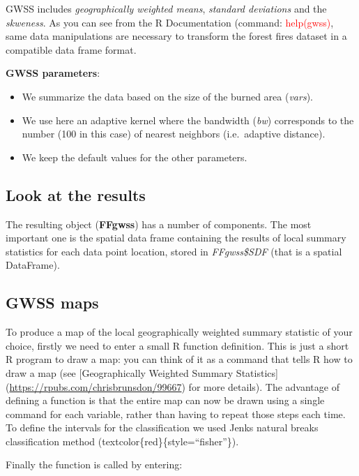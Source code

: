 \documentclass[
]{book}
\theoremstyle{definition}
\theoremstyle{definition}
\theoremstyle{definition}
\theoremstyle{definition}
\theoremstyle{remark}
\begin{document}
GWSS includes \emph{geographically weighted means}, \emph{standard deviations} and the \emph{skweness}.
As you can see from the R Documentation (command: \textcolor{red}{help(gwss)}, same data manipulations are necessary to transform the forest fires dataset in a compatible data frame format.

\textbf{GWSS parameters}:

\begin{itemize}
\item
  We summarize the data based on the size of the burned area (\emph{vars}).
\item
  We use here an adaptive kernel where the bandwidth (\emph{bw}) corresponds to the number (100 in this case) of nearest neighbors (i.e.~adaptive distance).
\item
  We keep the default values for the other parameters.
\end{itemize}

\hypertarget{look-at-the-results}{%
\subsection{Look at the results}\label{look-at-the-results}}

The resulting object (\textbf{FFgwss}) has a number of components.
The most important one is the spatial data frame containing the results of local summary statistics for each data point location, stored in \emph{FFgwss\$SDF} (that is a spatial DataFrame).

\hypertarget{gwss-maps}{%
\subsection{GWSS maps}\label{gwss-maps}}

To produce a map of the local geographically weighted summary statistic of your choice, firstly we need to enter a small R function definition.
This is just a short R program to draw a map: you can think of it as a command that tells R how to draw a map (see {[}Geographically Weighted Summary Statistics{]} (\url{https://rpubs.com/chrisbrunsdon/99667}) for more details).
The advantage of defining a function is that the entire map can now be drawn using a single command for each variable, rather than having to repeat those steps each time.
To define the intervals for the classification we used Jenks natural breaks classification method (textcolor\{red\}\{style=``fisher''\}).

Finally the function is called by entering:
\end{document}
